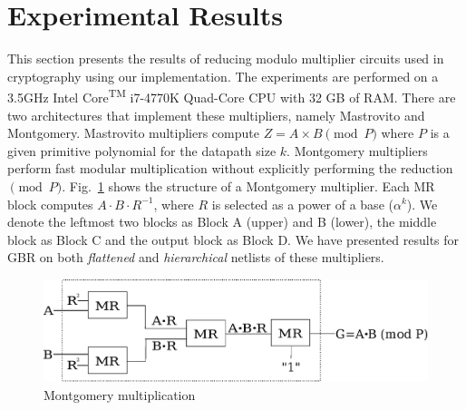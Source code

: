 %

%

\section{Experimental Results}
\label{sec:exp}
\iffalse
This section presents the results of reducing modulo multiplier
circuits used in cryptography using our implementation. The
experiments are performed on a 3.5GHz Intel 
Core\textsuperscript{TM} i7-4770K Quad-Core CPU with 32 GB of RAM. There are
two architectures that implement these multipliers, namely Mastrovito
and Montgomery. 
Mastrovito multipliers compute $Z = A\times B \pmod{
  P}$
where $P$ is a given primitive polynomial for the datapath size
$k$. 
Montgomery multipliers perform fast modular multiplication without
explicitly performing the reduction $\pmod{P}$. 
Fig.~\ref{montfig} shows the structure of a Montgomery
multiplier. Each MR block computes $A\cdot B\cdot R^{-1}$, where $R$
is selected as a power of a base ($\alpha^{k}$). We denote the leftmost
two blocks as Block A (upper) and B (lower), the middle block as Block
C and the output block as Block D. We have presented results for GBR
on both \textit{flattened} and \textit{hierarchical} netlists of these
multipliers. 

\begin{figure}[H]
  \centering
  \includegraphics[scale=0.34]{new_mmcircuit}
  \caption{Montgomery multiplication}
  \label{montfig}
  \end{figure}


